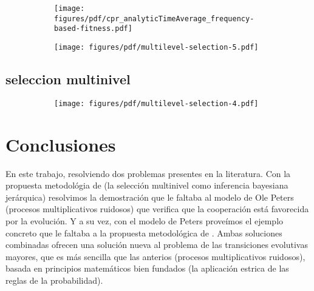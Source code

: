 \documentclass[a4paper,10pt]{article}
\begin{document}
\begin{figure}[H]
    \centering
    \begin{subfigure}[b]{0.66\textwidth}
    \texttt{[image: figures/pdf/cpr\_analyticTimeAverage\_frequency-based-fitness.pdf]}
    \end{subfigure}
    \caption{
    }
    \label{fig:cpr_analyticTimeAverage_frequency-based-fitness}
\end{figure}


\begin{figure}[H]
    \centering
    \begin{subfigure}[b]{0.66\textwidth}
    \texttt{[image: figures/pdf/multilevel-selection-5.pdf]}
    \end{subfigure}
    \caption{
    }
    \label{fig:multilevel-selection-5}
\end{figure}


\subsection{seleccion multinivel}


\begin{figure}[H]
    \centering
    \begin{subfigure}[b]{0.66\textwidth}
    \texttt{[image: figures/pdf/multilevel-selection-4.pdf]}
    \end{subfigure}
    \caption{
    }
    \label{fig:multilevel-selection-4}
\end{figure}

\section{Conclusiones}

En este trabajo, resolviendo dos problemas presentes en la literatura.
Con la propuesta metodológia de \cite{czegel2019-bayesianEvolution} (la selección multinivel como inferencia bayesiana jerárquica) resolvimos la demostración que le faltaba al modelo de Ole Peters (procesos multiplicativos ruidosos) que verifica que la cooperación está favorecida por la evolución.
Y a su vez, con el modelo de Peters proveímos el ejemplo concreto que le faltaba a la propuesta metodológica de \cite{czegel2019-bayesianEvolution}.
Ambas soluciones combinadas ofrecen una solución nueva al problema de las transiciones evolutivas mayores, que es más sencilla que las anterios (procesos multiplicativos ruidosos), basada en principios matemáticos bien fundados (la aplicación estrica de las reglas de la probabilidad).
\end{document}

